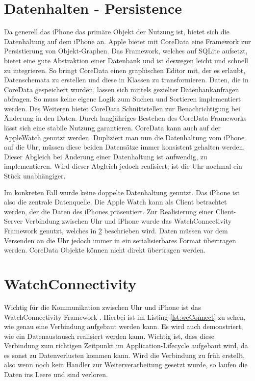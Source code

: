 \section{Datenhalten - Persistence}
Da generell das iPhone das primäre Objekt der Nutzung ist, bietet sich die Datenhaltung auf dem iPhone an. Apple bietet mit CoreData \cite{Apple:2015swiftOpen} eine Framework zur Persistierung von Objekt-Graphen. Das Framework, welches auf SQLite aufsetzt, bietet eine gute Abstraktion einer Datenbank und ist deswegen leicht und schnell zu integrieren. So bringt CoreData einen graphischen Editor mit, der es erlaubt, Datenschemata zu erstellen und diese in Klassen zu transformieren. Daten, die in CoreData gespeichert wurden, lassen sich mittels gezielter Datenbankanfragen abfragen. So muss keine eigene Logik zum Suchen und Sortieren implementiert werden. Des Weiteren bietet CoreData Schnittstellen zur Benachrichtigung bei Änderung in den Daten. Durch langjähriges Bestehen des CoreData Frameworks lässt sich eine stabile Nutzung garantieren. CoreData kann auch auf der AppleWatch genutzt werden. Dupliziert man nun die Datenhaltung vom iPhone auf die Uhr, müssen diese beiden Datensätze immer konsistent gehalten werden. Dieser Abgleich bei Änderung einer Datenhaltung ist aufwendig, zu implementieren. Wird dieser Abgleich jedoch realisiert, ist die Uhr nochmal ein Stück unabhängiger. 

Im konkreten Fall wurde keine doppelte Datenhaltung genutzt. Das iPhone ist also die zentrale Datenquelle. Die Apple Watch kann als Client betrachtet werden, der die Daten des iPhones präsentiert. Zur Realisierung einer Client-Server Verbindung zwischen Uhr und iPhone wurde das WatchConnectivity Framework genutzt, welches in \ref{watchCon} beschrieben wird. Daten müssen vor dem Versenden an die Uhr jedoch immer in ein serialisierbares Format übertragen werden. CoreData Objekte  können nicht direkt übertragen werden.


\section{WatchConnectivity}
\label{watchCon}
Wichtig für die Kommunikation zwischen Uhr und iPhone ist das WatchConnectivity Framework \cite{Apple:2015SharingDataToWatch}. Hierbei ist im Listing \ref{lst:wcConnect} zu sehen, wie genau eine Verbindung aufgebaut werden kann. Es wird auch demonstriert, wie ein Datenaustausch realisiert werden kann. Wichtig ist, dass diese Verbindung zum richtigen Zeitpunkt im Application-Lifecycle aufgebaut wird, da es sonst zu Datenverlusten kommen kann. Wird die Verbindung zu früh erstellt, also wenn noch kein Handler zur Weiterverarbeitung gesetzt wurde, so laufen die Daten ins Leere und sind verloren.

